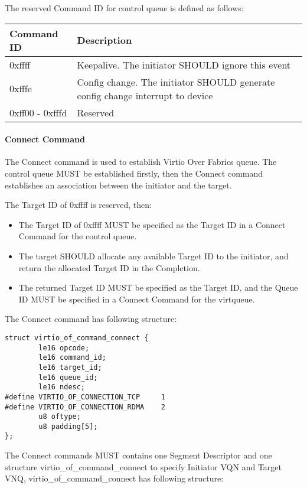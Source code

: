 The reserved Command ID for control queue is defined as follows:

\begin{tabular}{ |l|l| }
\hline
Command ID & Description \\
\hline \hline
0xffff & Keepalive. The initiator SHOULD ignore this event \\
\hline
0xfffe & Config change. The initiator SHOULD generate config change interrupt to device \\
\hline
0xff00 - 0xfffd & Reserved \\
\hline
\end{tabular}

\paragraph{Connect Command}\label{sec:Virtio Transport Options / Virtio Over Fabrics / Transmission Protocol / Commands Definition / Connect Command}
The Connect command is used to establish Virtio Over Fabrics queue. The control queue MUST be established firstly, then the Connect command establishes an association between the initiator and the target.

The Target ID of 0xffff is reserved, then:
\begin{itemize}
\item The Target ID of 0xffff MUST be specified as the Target ID in a Connect Command for the control queue.
\item The target SHOULD allocate any available Target ID to the initiator, and return the allocated Target ID in the Completion.
\item The returned Target ID MUST be specified as the Target ID, and the Queue ID MUST be specified in a Connect Command for the virtqueue.
\end{itemize}

The Connect command has following structure:

\begin{lstlisting}
struct virtio_of_command_connect {
        le16 opcode;
        le16 command_id;
        le16 target_id;
        le16 queue_id;
        le16 ndesc;
#define VIRTIO_OF_CONNECTION_TCP     1
#define VIRTIO_OF_CONNECTION_RDMA    2
        u8 oftype;
        u8 padding[5];
};
\end{lstlisting}

The Connect commands MUST contains one Segment Descriptor and one structure virtio_of_command_connect to specify Initiator VQN and Target VNQ, virtio_of_command_connect has following structure:

